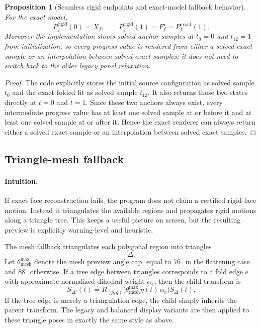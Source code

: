 \documentclass[11pt]{article}
\newtheorem{proposition}[definition]{Proposition}
\theoremstyle{remark}
\begin{document}
\begin{proposition}[Seamless rigid endpoints and exact-model fallback behavior]
For the exact model,
\[
P_f^{\mathrm{rigid}}(0)=X_f,
\qquad
P_f^{\mathrm{rigid}}(1)=F_f^\star=P_f^{\mathrm{exact}}(1).
\]
Moreover the implementation stores solved anchor samples at $t_0=0$ and
$t_{12}=1$ from initialization, so every progress value is rendered from either
a solved exact sample or an interpolation between solved exact samples; it does
not need to switch back to the older legacy panel relaxation.
\end{proposition}

\begin{proof}
The code explicitly stores the initial source configuration as solved sample
$t_0$ and the exact folded fit as solved sample $t_{12}$. It also returns those
two states directly at $t=0$ and $t=1$. Since these two anchors always exist,
every intermediate progress value has at least one solved sample at or before
it and at least one solved sample at or after it. Hence the exact renderer can
always return either a solved exact sample or an interpolation between solved
exact samples.
\end{proof}

\subsection*{Triangle-mesh fallback}

\paragraph{Intuition.}
If exact face reconstruction fails, the program does not claim a certified
rigid-face motion. Instead it triangulates the available regions and propagates
rigid motions along a triangle tree. This keeps a useful picture on screen, but
the resulting preview is explicitly warning-level and heuristic.

The mesh fallback triangulates each polygonal region into triangles
\[
\Delta.
\]
Let $\theta_{\mathrm{mesh}}^{\max}$ denote the mesh preview angle cap, equal to
$76^\circ$ in the flattening case and $88^\circ$ otherwise. If a tree edge
between triangles corresponds to a fold edge $e$ with approximate normalized
dihedral weight $\alpha_e$, then the child transform is
\[
S_{\Delta'}(t)
=
R_{(p,q)}\!\bigl(\theta_{\mathrm{mesh}}^{\max}\eta(t)\,\alpha_e\bigr)
S_\Delta(t).
\]
If the tree edge is merely a triangulation edge, the child simply inherits the
parent transform. The legacy and balanced display variants are then applied to
these triangle poses in exactly the same style as above.
\end{document}
